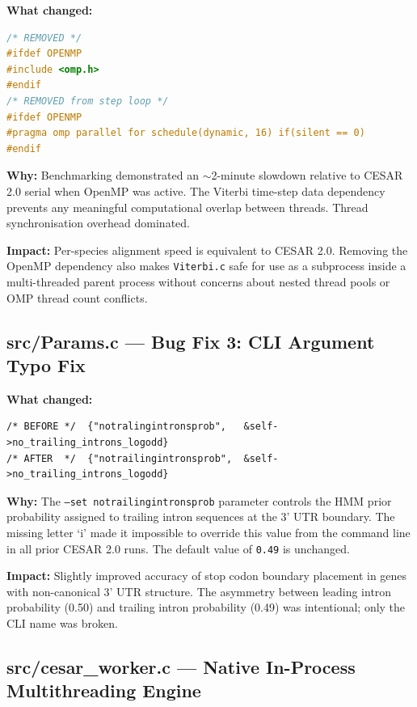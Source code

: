 \documentclass[12pt,a4paper]{article}
\begin{document}
\textbf{What changed:}
\begin{lstlisting}[language=C]
/* REMOVED */
#ifdef OPENMP
#include <omp.h>
#endif
/* REMOVED from step loop */
#ifdef OPENMP
#pragma omp parallel for schedule(dynamic, 16) if(silent == 0)
#endif
\end{lstlisting}

\textbf{Why:} Benchmarking demonstrated an $\sim$2-minute slowdown relative to CESAR 2.0
serial when OpenMP was active. The Viterbi time-step data dependency prevents any
meaningful computational overlap between threads. Thread synchronisation overhead
dominated.

\textbf{Impact:} Per-species alignment speed is equivalent to CESAR 2.0. Removing the
OpenMP dependency also makes \texttt{Viterbi.c} safe for use as a subprocess inside a
multi-threaded parent process without concerns about nested thread pools or OMP thread
count conflicts.



\subsection{src/Params.c --- Bug Fix 3: CLI Argument Typo Fix}

\textbf{What changed:}
\begin{lstlisting}
/* BEFORE */  {"notralingintronsprob",   &self->no_trailing_introns_logodd}
/* AFTER  */  {"notrailingintronsprob",  &self->no_trailing_introns_logodd}
\end{lstlisting}

\textbf{Why:} The \texttt{--set notrailingintronsprob} parameter controls the HMM prior
probability assigned to trailing intron sequences at the 3' UTR boundary. The missing
letter `i' made it impossible to override this value from the command line in all prior
CESAR 2.0 runs. The default value of \texttt{0.49} is unchanged.

\textbf{Impact:} Slightly improved accuracy of stop codon boundary placement in genes
with non-canonical 3' UTR structure. The asymmetry between leading intron probability
(0.50) and trailing intron probability (0.49) was intentional; only the CLI name was
broken.

\subsection{src/cesar\_worker.c --- Native In-Process Multithreading Engine}
\end{document}
